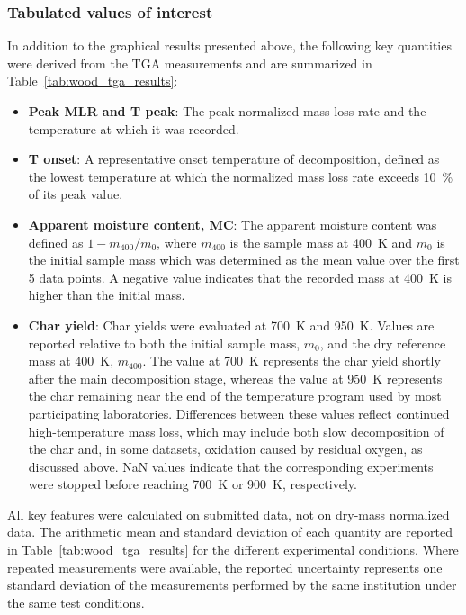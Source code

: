 \documentclass{book}
\begin{document}
\begin{table}[htbp]
    \centering
    \caption{Approximate comparison of TGA repeatability and reproducibility observed in MaCFP-4 (wood) and MaCFP-2 (PMMA).}
    \label{tab:tga_macfp2_comparison}
    
\end{table}

\clearpage
\subsubsection{Tabulated values of interest}

In addition to the graphical results presented above, the following key quantities were derived from the TGA measurements and are summarized in Table~\ref{tab:wood_tga_results}:

\begin{itemize}
\item \textbf{Peak MLR and T peak}: The peak normalized mass loss rate and the temperature at which it was recorded.
\item \textbf{T onset}: A representative onset temperature of decomposition, defined as the lowest temperature at which the normalized mass loss rate exceeds 10~\% of its peak value.
\item \textbf{Apparent moisture content, MC}: The apparent moisture content was defined as $1-m_{400}/m_0$, where $m_{400}$ is the sample mass at 400~K and $m_0$ is the initial sample mass which was determined as the mean value over the first 5 data points. A negative value indicates that the recorded mass at 400~K is higher than the initial mass.
\item \textbf{Char yield}: Char yields were evaluated at 700~K and 950~K. Values are reported relative to both the initial sample mass, $m_0$, and the dry reference mass at 400~K, $m_{400}$. The value at 700~K represents the char yield shortly after the main decomposition stage, whereas the value at 950~K represents the char remaining near the end of the temperature program used by most participating laboratories. Differences between these values reflect continued high-temperature mass loss, which may include both slow decomposition of the char and, in some datasets, oxidation caused by residual oxygen, as discussed above. NaN values indicate that the corresponding experiments were stopped before reaching 700~K or 900~K, respectively.
\end{itemize}

All key features were calculated on submitted data, not on dry-mass normalized data. The arithmetic mean and standard deviation of each quantity are reported in Table~\ref{tab:wood_tga_results} for the different experimental conditions. Where repeated measurements were available, the reported uncertainty represents one standard deviation of the measurements performed by the same institution under the same test conditions.
\end{document}
